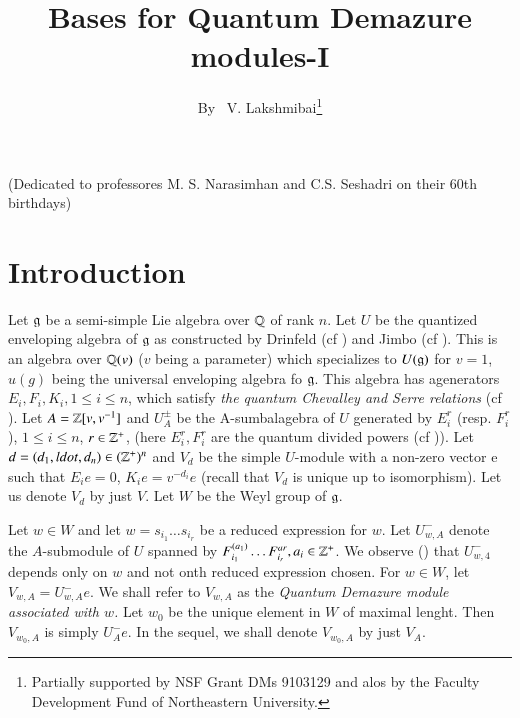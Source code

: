 \title{Bases for Quantum Demazure modules-I}

\author{By~ V. Lakshmibai\footnote{Partially supported by NSF Grant DMs 9103129 and alos by the Faculty Development Fund of Northeastern University.}}

\date{}
\maketitle

\begin{center}
(Dedicated to professores M. S. Narasimhan and C.S. Seshadri on their 60th birthdays)
\end{center}

\section{Introduction}\label{art9-sec-1}
Let $\mathfrak{g}$ be a semi-simple Lie algebra over $\mathbb{Q}$ of rank $n$. Let $U$ be the quantized enveloping algebra of $\mathfrak{g}$ as constructed by Drinfeld (cf \cite{art9-keyD}) and Jimbo (cf \cite{art9-keyJ}). This is an algebra over $\mathbb{Q}(v)$ ($v$ being a parameter)  which specializes to $U(\mathfrak{g})$ for $v=1$, $u(g)$ being the universal enveloping algebra fo $\mathfrak{g}$. This algebra has agenerators $E_{i}, F_{i}, K_{i}, 1\leq i \leq n$, which satisfy \textit{the quantum Chevalley and Serre relations} (cf \cite{art9-keyL1}). Let $A= \mathbb{Z}[v, v^{-1}] $ and $U_{A}^{\pm}$ be the A-sumbalagebra of $U$ generated by $E_{i}^{r}$ (resp. $F_{i}^{r}$), $1\leq i \leq n$, $r \in \mathbb{Z}^{+}$, (here $E_{i}^{r}, F_{i}^{r}$ are the quantum divided powers (cf \cite{art9-keyJ})). Let $d=(d_{1}, ldot, d_{n}) \in (\mathbb{Z}^{+})^{n}$ and $V_{d}$ be the simple $U$-module with a non-zero vector e such that $E_{i}e=0$, $K_{i}e =v^{-d_{i}}e$ (recall that $V_{d}$ is unique up to isomorphism). Let us denote $V_{d}$ by just $V$. Let $W$ be the Weyl group of $\mathfrak{g}$.

Let $w \in W$ and let $w=s_{i_{1}}\ldots s_{i_{r}}$ be a reduced expression for $w$. Let $U_{w,A}^{-}$ denote the $A$-submodule of $U$ spanned by $F_{i_{1}}^{(a_{1})}\ldots F_{i_{r}}^{ar}, a_{i}\in \mathbb{Z}^{+}$. We observe (\cite{art9-keyL4}) that $U_{w,4}^{-}$ depends only on $w$ and not onth reduced expression chosen. For $w\in W$, let $V_{w,A}=U_{w,A}^{-}e$. We shall refer to $V_{w, A}$ as the \textit{Quantum Demazure module associated with $w$.} Let $w_{0}$ be the unique element in $W$ of maximal lenght. Then $V_{w_{0},A}$ is simply $U_{A}^{-}e$. In the sequel, we shall denote $V_{w_{0}, A}$ by just $V_{A}$.

